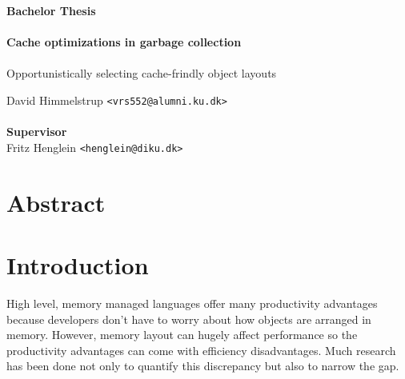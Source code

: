 \documentclass[a4paper,oneside]{memoir}
\begin{document}
    \thispagestyle{empty}
    \begin{adjustwidth}{-3cm}{-1.5cm}
    \vspace*{-1cm}
    \textbf{\Huge Bachelor Thesis} \\
    \vspace*{2.5cm} \\
    \textbf{\Huge Cache optimizations in garbage collection} \\
    \vspace*{.1cm} \\
    {\huge Opportunistically selecting cache-frindly object layouts} \\
    \begin{tabbing}
    David Himmelstrup \hspace{1cm} \= \texttt{<vrs552@alumni.ku.dk>} \\
    \\[12cm]
    \textbf{\Large Supervisor} \\
    Fritz Henglein \> \texttt{<henglein@diku.dk>} \\
    \end{tabbing}
    \end{adjustwidth}
    \newpage
    \ClearWallPaper

\chapter*{Abstract}



\newpage

\tableofcontents*

\chapter{Introduction}
High level, memory managed languages offer many productivity advantages because
developers don't have to worry about how objects are arranged in memory. However,
memory layout can hugely affect performance so the productivity advantages can
come with efficiency disadvantages. Much research has been done not only to
quantify this discrepancy but also to narrow the gap.
\end{document}
